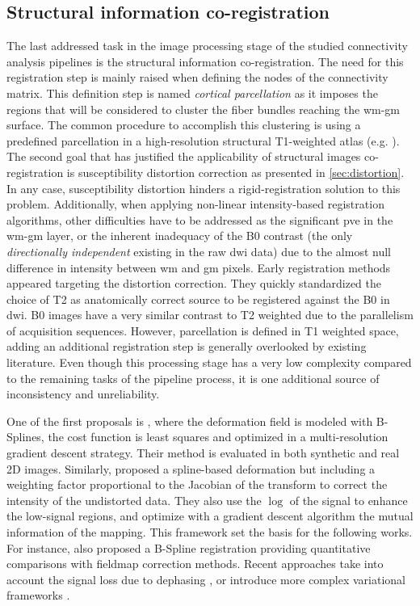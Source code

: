 \subsection{Structural information co-registration}
\label{sec:registration}

The last addressed task in the image processing stage of the studied
connectivity analysis pipelines is the structural information co-registration.
The need for this registration step is mainly raised when defining the
nodes of the connectivity matrix.
This definition step is named
\textit{cortical parcellation} as it imposes the regions that will be
considered to cluster the fiber bundles reaching the \gls{wm}-\gls{gm}
surface.
The common procedure to accomplish this clustering is using
a predefined parcellation in a high-resolution structural T1-weighted
atlas (e.g.
\citep{greve_accurate_2009}).
The second goal that has
justified the applicability of structural
images co-registration is susceptibility distortion correction
as presented in \autoref{sec:distortion}.
In any case, susceptibility
distortion hinders a rigid-registration solution to this problem.
Additionally, when applying non-linear intensity-based
registration algorithms, other difficulties have to be addressed as
the significant \gls{pve} in the \gls{wm}-\gls{gm} layer, or the
inherent inadequacy of the B0 contrast (the only \textit{directionally
independent} existing in the raw \gls{dwi} data) due to the almost null
difference in intensity between \gls{wm} and \gls{gm} pixels.
Early
registration methods appeared targeting the distortion correction.
They quickly standardized the choice of T2 as anatomically correct source
to be registered against the B0 in \gls{dwi}.
B0 images have a very similar
contrast to T2 weighted due to the parallelism of acquisition sequences.
However, parcellation is defined in T1 weighted space, adding an additional
registration step is generally overlooked by existing literature.
Even though this
processing stage has a very low complexity compared to the remaining tasks of
the pipeline process, it is one additional source of inconsistency
and unreliability.


One of the first proposals is \citep{kybic_unwarping_2000}, where the deformation
field is modeled with B-Splines, the cost function is least squares and optimized
in a multi-resolution gradient descent strategy.
Their method is evaluated in
both synthetic and real 2D images.
Similarly,
\citep{studholme_accurate_2000} proposed a spline-based deformation but including
a weighting factor proportional to the Jacobian of the transform to correct the
intensity of the undistorted data.
They also use the $\log$ of the signal to
enhance the low-signal regions, and optimize with a gradient descent algorithm
the mutual information of the mapping.
This framework set the basis for the following
works.
For instance, \citep{wu_comparison_2008} also proposed a B-Spline registration
providing quantitative comparisons with fieldmap correction methods.
Recent approaches
take into account the signal loss due to dephasing \citep{li_accounting_2007}, or
introduce more complex variational frameworks \citep{tao_variational_2009}.

